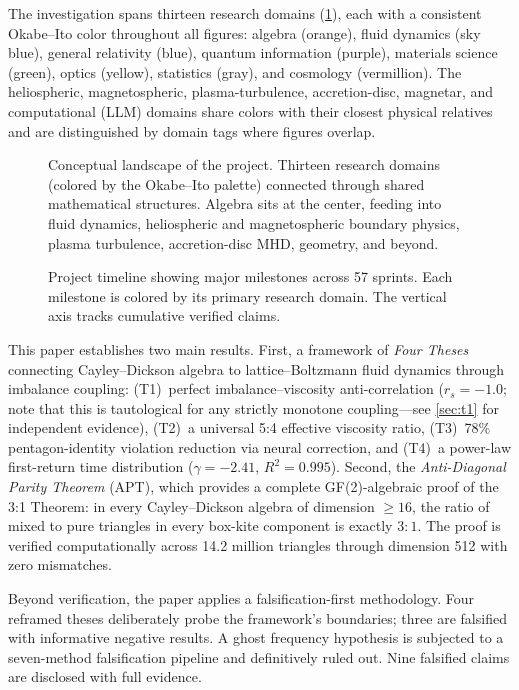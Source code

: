 \documentclass[12pt,openany]{report}
\theoremstyle{definition}
\theoremstyle{plain}
\theoremstyle{remark}
\begin{document}
The investigation spans thirteen research domains
(\cref{fig:concept-map}), each with a consistent Okabe--Ito color
throughout all figures: algebra (orange), fluid dynamics (sky blue),
general relativity (blue), quantum information (purple), materials
science (green), optics (yellow), statistics (gray), and cosmology
(vermillion).  The heliospheric, magnetospheric, plasma-turbulence,
accretion-disc, magnetar, and computational (LLM) domains share colors
with their closest physical relatives and are distinguished by domain
tags where figures overlap.

\begin{figure}[htbp]
\centering

\caption{Conceptual landscape of the project.  Thirteen research domains
(colored by the Okabe--Ito palette) connected through shared mathematical
structures.  Algebra sits at the center, feeding into fluid dynamics,
heliospheric and magnetospheric boundary physics, plasma turbulence,
accretion-disc MHD, geometry, and beyond.}
\label{fig:concept-map}
\end{figure}

\begin{figure}[htbp]
\centering

\caption{Project timeline showing major milestones across 57 sprints.
Each milestone is colored by its primary research domain.  The vertical
axis tracks cumulative verified claims.}
\label{fig:timeline}
\end{figure}

This paper establishes two main results.  First, a framework of
\emph{Four Theses} connecting Cayley--Dickson algebra to
lattice--Boltzmann fluid dynamics through imbalance coupling:
(T1)~perfect imbalance--viscosity anti-correlation ($r_s = -1.0$; note
that this is tautological for any strictly monotone coupling---see
\cref{sec:t1} for independent evidence),
(T2)~a universal 5:4 effective viscosity ratio,
(T3)~78\% pentagon-identity violation reduction via neural correction,
and (T4)~a power-law first-return time distribution ($\gamma = -2.41$, $R^2 = 0.995$).
Second, the \emph{Anti-Diagonal Parity Theorem} (APT), which provides a
complete GF(2)-algebraic proof of the 3:1 Theorem: in every
Cayley--Dickson algebra of dimension $\geq 16$, the ratio of mixed to
pure triangles in every box-kite component is exactly $3{:}1$.  The
proof is verified computationally across 14.2 million triangles through
dimension 512 with zero mismatches.

Beyond verification, the paper applies a falsification-first
methodology.  Four reframed theses deliberately probe the framework's
boundaries; three are falsified with informative negative results.  A
ghost frequency hypothesis is subjected to a seven-method falsification
pipeline and definitively ruled out.  Nine falsified claims are
disclosed with full evidence.
\end{document}
